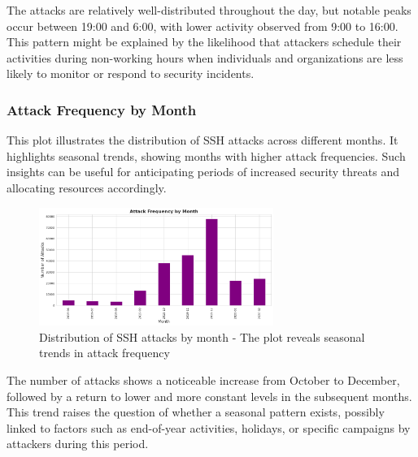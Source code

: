         \clearpage %
        
            The attacks are relatively well-distributed throughout the day, but notable peaks occur between 19:00 and 6:00, with lower activity observed from 9:00 to 16:00. This pattern might be explained by the likelihood that attackers schedule their activities during non-working hours when individuals and organizations are less likely to monitor or respond to security incidents.

        \subsubsection{Attack Frequency by Month \\}
        
            This plot illustrates the distribution of SSH attacks across different months. It highlights seasonal trends, showing months with higher attack frequencies. Such insights can be useful for anticipating periods of increased security threats and allocating resources accordingly.

            \vspace{-0.1cm}

            \begin{figure}[H]
                \centering
                \includegraphics[width=0.68\textwidth]{../figures/plots/section1/attack_frequency_by_month.png}
                \caption{Distribution of SSH attacks by month - The plot reveals seasonal trends in attack frequency}
                \label{fig:attack_frequency_by_month}
            \end{figure}
            
            \vspace{-0.1cm}
            
            The number of attacks shows a noticeable increase from October to December, followed by a return to lower and more constant levels in the subsequent months. This trend raises the question of whether a seasonal pattern exists, possibly linked to factors such as end-of-year activities, holidays, or specific campaigns by attackers during this period.


